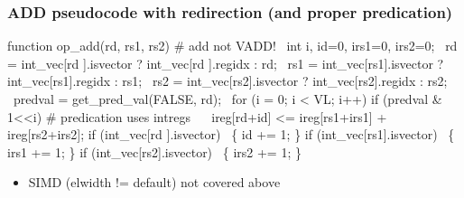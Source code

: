 \documentclass[slidestop]{beamer}
\begin{document}




\begin{frame}[fragile]
\frametitle{ADD pseudocode with redirection (and proper predication)}

\begin{semiverbatim}
function op\_add(rd, rs1, rs2) # add not VADD!
  int i, id=0, irs1=0, irs2=0;
  rd  = int\_vec[rd ].isvector ? int\_vec[rd ].regidx : rd;
  rs1 = int\_vec[rs1].isvector ? int\_vec[rs1].regidx : rs1;
  rs2 = int\_vec[rs2].isvector ? int\_vec[rs2].regidx : rs2;
  predval = get\_pred\_val(FALSE, rd);
  for (i = 0; i < VL; i++)
    if (predval \& 1<<i) # predication uses intregs
       ireg[rd+id] <= ireg[rs1+irs1] + ireg[rs2+irs2];
    if (int\_vec[rd ].isvector)  \{ id += 1; \}
    if (int\_vec[rs1].isvector)  \{ irs1 += 1; \}
    if (int\_vec[rs2].isvector)  \{ irs2 += 1; \}
\end{semiverbatim}

  \begin{itemize}
   \item SIMD (elwidth != default) not covered above
  \end{itemize}
\end{frame}
\end{document}

